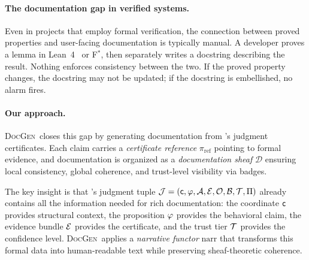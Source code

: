 \documentclass[11pt]{article}
\newcommand{\DocGen}{\textsc{DocGen}}
\newcommand{\DocSheaf}{\mathcal{D}}
\newcommand{\CertRef}{\pi_{\mathrm{ref}}}
\newcommand{\NarrFunc}{\mathrm{narr}}
\begin{document}
\paragraph{The documentation gap in verified systems.}
Even in projects that employ formal verification, the connection
between proved properties and user-facing documentation is typically
manual.  A developer proves a lemma in Lean~4~\cite{Lean4} or
F$^{*}$, then separately writes a docstring describing the result.
Nothing enforces consistency between the two.  If the proved property
changes, the docstring may not be updated; if the docstring is
embellished, no alarm fires.

\paragraph{Our approach.}
\DocGen\ closes this gap by generating documentation from \JuGeo's
judgment certificates.  Each claim carries a \emph{certificate
reference} $\CertRef$ pointing to formal evidence, and documentation is
organized as a \emph{documentation sheaf} $\DocSheaf$ ensuring local
consistency, global coherence, and trust-level visibility via badges.

The key insight is that \JuGeo's judgment tuple
$\mathcal{J} = (\mathsf{c}, \varphi, \mathcal{A}, \mathcal{E}, \mathcal{O}, \mathcal{B}, \mathcal{T}, \Pi)$
already contains all the information needed for rich documentation:
the coordinate $\mathsf{c}$ provides structural context, the proposition
$\varphi$ provides the behavioral claim, the evidence bundle $\mathcal{E}$
provides the certificate, and the trust tier $\mathcal{T}$ provides the
confidence level.  \DocGen\ applies a \emph{narrative functor}
$\NarrFunc$ that transforms this formal data into human-readable text
while preserving sheaf-theoretic coherence.
\end{document}

